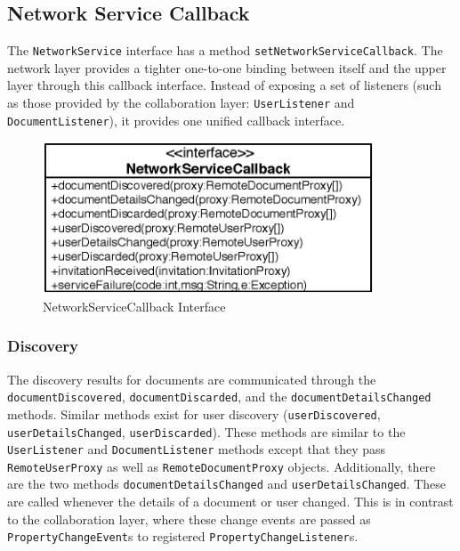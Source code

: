 \subsection{Network Service Callback}
The \texttt{Network\-Service} interface has a method 
\texttt{set\-Network\-Service\-Callback}. The network layer provides a tighter
one-to-one binding between itself and the upper layer through this
callback interface. Instead of exposing a set of listeners
(such as those provided by the collaboration layer: \texttt{User\-Listener}
and \texttt{Document\-Listener}), it provides one unified callback interface.

\begin{figure}[H]
 \centering
 \includegraphics[width=9.81cm,height=4.52cm]{../images/finalreport/architecture_networkservicecallback_uml.eps}
 \caption{NetworkServiceCallback Interface}
\end{figure}


\subsubsection{Discovery}
\label{sect:archoverview.net.discovery}
The discovery results for documents are communicated through the 
\texttt{document\-Discovered}, \texttt{document\-Discarded}, and the
\texttt{document\-Details\-Changed} methods. Similar methods exist for user
discovery (\texttt{user\-Discovered}, \texttt{user\-Details\-Changed}, 
\texttt{user\-Discarded}). These methods are similar to the 
\texttt{User\-Listener} and \texttt{Document\-Listener} methods except that they
pass \texttt{Remote\-User\-Proxy} as well as \texttt{Remote\-Document\-Proxy} 
objects. Additionally, there are the two methods 
\texttt{document\-Details\-Changed}
and \texttt{user\-Details\-Changed}. These are called whenever the details of
a document or user changed. This is in contrast to the collaboration layer,
where these change events are passed as \texttt{Property\-Change\-Event}s to
registered \texttt{Property\-Change\-Listener}s.

